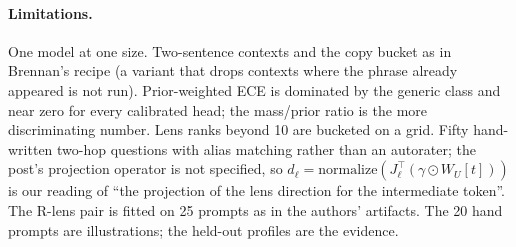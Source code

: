 \documentclass[11pt]{article}
\newcommand{\WU}{W_U}
\begin{document}
\paragraph{Limitations.}
One model at one size. Two-sentence contexts and the copy bucket as in Brennan's recipe (a variant that drops contexts where the phrase already appeared is not run). Prior-weighted ECE is dominated by the generic class and near zero for every calibrated head; the mass/prior ratio is the more discriminating number. Lens ranks beyond 10 are bucketed on a grid. Fifty hand-written two-hop questions with alias matching rather than an autorater; the post's projection operator is not specified, so $d_\ell=\mathrm{normalize}(J_\ell^\top(\gamma\odot\WU[t]))$ is our reading of ``the projection of the lens direction for the intermediate token''. The R-lens pair is fitted on 25 prompts as in the authors' artifacts. The 20 hand prompts are illustrations; the held-out profiles are the evidence.




\appendix
\end{document}
